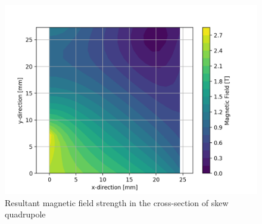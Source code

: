 \begin{figure}[ht!]
    \centering
    \includegraphics[width=0.49\linewidth]{figures/skew_quad_bcs/magnetic_field_mapping/Quadrupole_Magnetic_Colour_plot.png}
    \caption{Resultant magnetic field strength in the cross-section of skew quadrupole}
    \label{fig:Quad_Mag_contour1}
\end{figure}